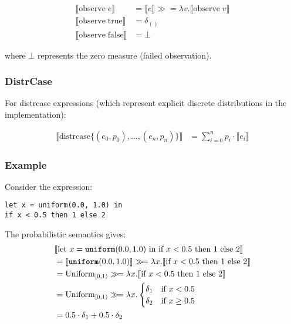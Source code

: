 \begin{align*}
\llbracket \text{observe}\; e \rrbracket &= \llbracket e \rrbracket \gg\!= \lambda v. \llbracket \text{observe}\; v \rrbracket \\
\llbracket \text{observe}\; \text{true} \rrbracket &= \delta_{()} \\
\llbracket \text{observe}\; \text{false} \rrbracket &= \bot
\end{align*}

where $\bot$ represents the zero measure (failed observation).

\subsubsection{DistrCase}

For distrcase expressions (which represent explicit discrete distributions in the implementation):

\begin{align*}
\llbracket \text{distrcase}\{(e_0, p_0), \ldots, (e_n, p_n)\} \rrbracket &= \sum_{i=0}^n p_i \cdot \llbracket e_i \rrbracket
\end{align*}

\subsubsection{Example}

Consider the expression:
\begin{lstlisting}
let x = uniform(0.0, 1.0) in
if x < 0.5 then 1 else 2
\end{lstlisting}

The probabilistic semantics gives:
\begin{align*}
&\llbracket \text{let } x = \text{\ttfamily\bfseries uniform}(0.0, 1.0) \text{ in if } x < 0.5 \text{ then } 1 \text{ else } 2 \rrbracket \\
&= \llbracket \text{\ttfamily\bfseries uniform}(0.0, 1.0) \rrbracket \gg\!= \lambda x. \llbracket \text{if } x < 0.5 \text{ then } 1 \text{ else } 2 \rrbracket \\
&= \text{Uniform}_{[0,1)} \gg\!= \lambda x. \llbracket \text{if } x < 0.5 \text{ then } 1 \text{ else } 2 \rrbracket \\
&= \text{Uniform}_{[0,1)} \gg\!= \lambda x. \begin{cases}
    \delta_1 & \text{if } x < 0.5 \\
    \delta_2 & \text{if } x \geq 0.5
\end{cases} \\
&= 0.5 \cdot \delta_1 + 0.5 \cdot \delta_2
\end{align*}


